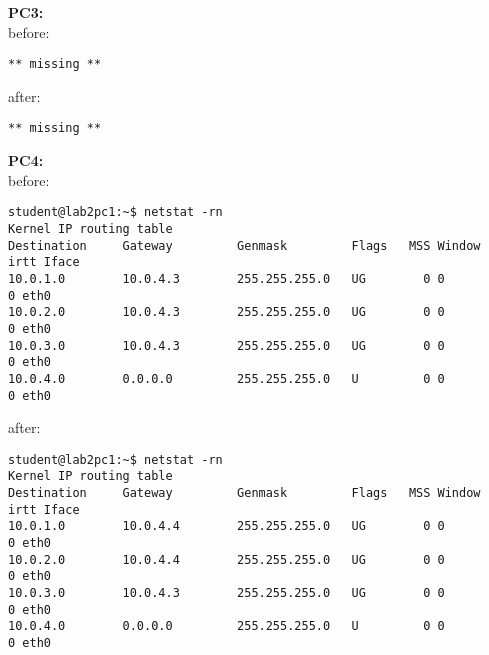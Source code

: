 \textbf{PC3:}\\
before:
\begin{lstlisting}
** missing **
\end{lstlisting}
after:
\begin{lstlisting}
** missing **
\end{lstlisting}

\textbf{PC4:}\\
before:
\begin{lstlisting}
student@lab2pc1:~$ netstat -rn
Kernel IP routing table
Destination     Gateway         Genmask         Flags   MSS Window  irtt Iface
10.0.1.0        10.0.4.3        255.255.255.0   UG        0 0          0 eth0
10.0.2.0        10.0.4.3        255.255.255.0   UG        0 0          0 eth0
10.0.3.0        10.0.4.3        255.255.255.0   UG        0 0          0 eth0
10.0.4.0        0.0.0.0         255.255.255.0   U         0 0          0 eth0
\end{lstlisting}
after:
\begin{lstlisting}
student@lab2pc1:~$ netstat -rn
Kernel IP routing table
Destination     Gateway         Genmask         Flags   MSS Window  irtt Iface
10.0.1.0        10.0.4.4        255.255.255.0   UG        0 0          0 eth0
10.0.2.0        10.0.4.4        255.255.255.0   UG        0 0          0 eth0
10.0.3.0        10.0.4.3        255.255.255.0   UG        0 0          0 eth0
10.0.4.0        0.0.0.0         255.255.255.0   U         0 0          0 eth0
\end{lstlisting}
